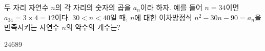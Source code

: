 두 자리 자연수 $n$의 각 자리의 숫자의 곱을 $a_n$이라 하자. 예를 들어 $n=34$이면 $a_{34}=3\times 4=12$이다. $30<n<40$일 때, $n$에 대한 이차방정식 $n^2-30n-90=a_n$을 만족시키는 자연수 $n$의 약수의 개수는?
\begin{choices32}{$2$}{$4$}{$6$}{$8$}{$9$}\end{choices32}
